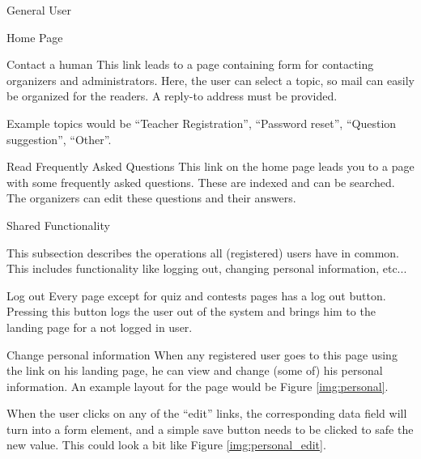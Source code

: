 \begin{section}{General User}
\begin{subsection}{Home Page}
        \begin{subsubsection}{Contact a human}
            This link leads to a page containing form for contacting organizers
            and administrators. Here, the user can select a topic, so mail can
            easily be organized for the readers. A reply-to address must be
            provided.

            Example topics would be ``Teacher Registration'', ``Password
            reset'', ``Question suggestion'', ``Other''.
        \end{subsubsection}

        \begin{subsubsection}{Read Frequently Asked Questions}
            This link on the home page leads you to a page with some frequently
            asked questions. These are indexed and can be searched. The
            organizers can edit these questions and their answers.
        \end{subsubsection}

    \end{subsection}

    \begin{subsection}{Shared Functionality}

        This subsection describes the operations all (registered) users have in
        common. This includes functionality like logging out, changing personal
        information, etc...

        \begin{subsubsection}{Log out}
            Every page except for quiz and contests pages has a log out button.
            Pressing this button logs the user out of the system and brings him
            to the landing page for a not logged in user.
        \end{subsubsection}

        \begin{subsubsection}{Change personal information}
            When any registered user goes to this page using the link on his
            landing page, he can view and change (some of) his personal
            information. An example layout for the page would be Figure
            \ref{img:personal}.

            When the user clicks on any of the ``edit'' links, the corresponding
            data field will turn into a form element, and a simple save button
            needs to be clicked to safe the new value. This could look a bit
            like Figure \ref{img:personal_edit}.


\end{subsubsection}
\end{subsection}
\end{section}
